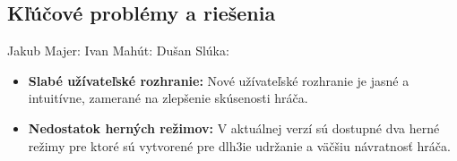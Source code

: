 \documentclass[a4paper, 11pt, onecolumn]{article}
\begin{document}
\subsection{Kľúčové problémy a riešenia}
Jakub Majer:
Ivan Mahút:
Dušan Slúka:
\begin{itemize}
    \item \textbf{Slabé užívateľské rozhranie:} Nové užívateľské rozhranie je jasné a intuitívne, zamerané na zlepšenie skúsenosti hráča.
    \item \textbf{Nedostatok herných režimov:} V aktuálnej verzí sú dostupné dva herné režimy pre ktoré sú vytvorené pre dlh3ie udržanie a väčšiu návratnosť hráča.
\end{itemize}
\end{document}
